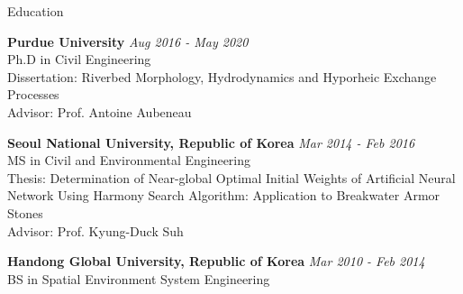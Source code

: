 \documentclass{resume_anzy} %
\begin{document}


\begin{rSection}{Education}

{\bf Purdue University} \hfill {\em Aug 2016 - May 2020} \\ 
Ph.D in Civil Engineering  \\
Dissertation: Riverbed Morphology, Hydrodynamics and Hyporheic Exchange Processes \\
Advisor: Prof. Antoine Aubeneau

{\bf Seoul National University, Republic of Korea} \hfill {\em Mar 2014 - Feb 2016} \\ 
MS in Civil and Environmental Engineering   \\
Thesis: Determination of Near-global Optimal Initial Weights of Artificial Neural Network Using Harmony Search Algorithm: Application to Breakwater Armor Stones \\
Advisor: Prof. Kyung-Duck Suh 

{\bf Handong Global University, Republic of Korea } \hfill {\em Mar 2010 - Feb 2014} \\ 
BS in Spatial Environment System Engineering  
\vspace{2mm}
\end{rSection}
\end{document}
